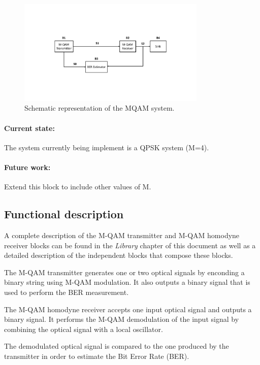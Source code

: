\begin{figure}
	\centering
	\includegraphics[width=0.8\textwidth]{./figures/MQAM_system_block_diagram}
	\caption{Schematic representation of the MQAM system.}\label{MQAM_system_block_diagram}
\end{figure}

\paragraph{Current state:} The system currently being implement is a QPSK system (M=4).

\paragraph{Future work:} Extend this block to include other values of M.

\subsection*{Functional description}

A complete description of the M-QAM transmitter and M-QAM homodyne receiver blocks can be found in the \textit{Library} chapter of this document as well as a detailed description of the independent blocks that compose these blocks.

The M-QAM transmitter generates one or two optical signals by enconding a binary string using M-QAM modulation. It also outputs a binary signal that is used to perform the BER measurement.

The M-QAM homodyne receiver accepts one input optical signal and outputs
a binary signal. It performs the M-QAM demodulation of the input signal by combining the optical signal with a local oscillator.

The demodulated optical signal is compared to the one produced by the transmitter in order to estimate the Bit Error Rate (BER).

